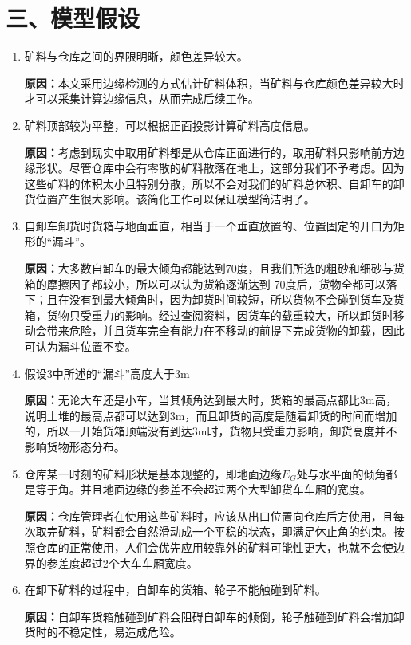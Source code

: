 \documentclass{my_paper}
\begin{document}
\section{三、模型假设}
\begin{enumerate}
    \item 矿料与仓库之间的界限明晰，颜色差异较大。
    
    \textbf{原因：}本文采用边缘检测的方式估计矿料体积，当矿料与仓库颜色差异较大时才可以采集计算边缘信息，从而完成后续工作。

    \item 矿料顶部较为平整，可以根据正面投影计算矿料高度信息。
    
    \textbf{原因：}考虑到现实中取用矿料都是从仓库正面进行的，取用矿料只影响前方边缘形状。尽管仓库中会有零散的矿料散落在地上，这部分我们不予考虑。因为这些矿料的体积太小且特别分散，所以不会对我们的矿料总体积、自卸车的卸货位置产生很大影响。该简化工作可以保证模型简洁明了。

    \item 自卸车卸货时货箱与地面垂直，相当于一个垂直放置的、位置固定的开口为矩形的“漏斗”。
    
    \textbf{原因：}大多数自卸车的最大倾角都能达到70度，且我们所选的粗砂和细砂与货箱的摩擦因子都较小，所以可以认为货箱逐渐达到 70度后，货物全都可以落下；且在没有到最大倾角时，因为卸货时间较短，所以货物不会碰到货车及货箱，货物只受重力的影响。经过查阅资料，因货车的载重较大，所以卸货时移动会带来危险，并且货车完全有能力在不移动的前提下完成货物的卸载，因此可认为漏斗位置不变。
    \item 假设3中所述的“漏斗”高度大于3m
    
    \textbf{原因：}无论大车还是小车，当其倾角达到最大时，货箱的最高点都比3m高，说明土堆的最高点都可以达到3m，而且卸货的高度是随着卸货的时间而增加的，所以一开始货箱顶端没有到达3m时，货物只受重力影响，卸货高度并不影响货物形态分布。

    \item 仓库某一时刻的矿料形状是基本规整的，即地面边缘$E_G$处与水平面的倾角都是等于角。并且地面边缘的参差不会超过两个大型卸货车车厢的宽度。
    
    \textbf{原因：}仓库管理者在使用这些矿料时，应该从出口位置向仓库后方使用，且每次取完矿料，矿料都会自然滑动成一个平稳的状态，即满足休止角的约束。按照仓库的正常使用，人们会优先应用较靠外的矿料可能性更大，也就不会使边界的参差度超过2个大车车厢宽度。

    \item 在卸下矿料的过程中，自卸车的货箱、轮子不能触碰到矿料。

    \textbf{原因：}自卸车货箱触碰到矿料会阻碍自卸车的倾倒，轮子触碰到矿料会增加卸货时的不稳定性，易造成危险。
\end{enumerate}
\end{document}

